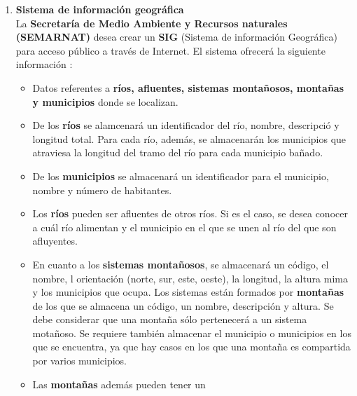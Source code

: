 \documentclass{article}
\begin{document}
\begin{enumerate}[label = (\alph*)]
{        }
        \item {
            \textbf{Sistema de información geográfica} \\
            La \textbf{Secretaría de Medio Ambiente y Recursos naturales 
            (SEMARNAT)} desea crear un \textbf{SIG} (Sistema de información
            Geográfica) para acceso público a través de Internet. El sistema 
            ofrecerá la siguiente información :
            \begin{itemize}
                \item {
                    Datos referentes a \textbf{ríos, afluentes, sistemas 
                    montañosos, montañas y municipios} donde se localizan.
                }
                \item {
                    De los \textbf{ríos} se alamcenará un identificador del
                    río, nombre, descripció y longitud total. Para cada río,
                    además, se almacenarán los municipios que atraviesa la 
                    longitud del tramo del río para cada municipio bañado.
                }
                \item {
                    De los \textbf{municipios} se almacenará un identificador
                    para el municipio, nombre y número de habitantes.
                }
                \item {
                    Los \textbf{ríos} pueden ser afluentes de otros ríos. Si
                    es el caso, se desea conocer a cuál río alimentan y el 
                    municipio en el que se unen al río del que son afluyentes.
                }
                \item {
                    En cuanto a los \textbf{sistemas montañosos}, se 
                    almacenará un código, el nombre, l orientación (norte, 
                    sur, este, oeste), la longitud, la altura mima y los 
                    municipios que ocupa. Los sistemas están formados por 
                    \textbf{montañas} de los que se almacena un código, un 
                    nombre, descripción y altura. Se debe considerar que una 
                    montaña sólo pertenecerá a un sistema motañoso. Se 
                    requiere también almacenar el municipio o municipios en
                    los que se encuentra, ya que hay casos en los que una 
                    montaña es compartida por varios municipios.
                }
                \item {
                    Las \textbf{montañas} además pueden tener un 
}
\end{itemize}}
\end{enumerate}
\end{document}

